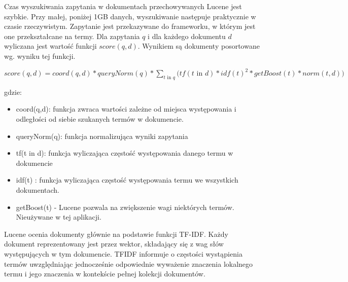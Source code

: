 Czas wyszukiwania zapytania w dokumentach przechowywanych Lucene jest szybkie. Przy małej, poniżej 1GB danych, wyszukiwanie następuje praktycznie w czasie rzeczywistym. Zapytanie jest przekazywane do frameworku, w którym jest one przekształcane na termy. Dla zapytania $q$ i dla każdego dokumentu $d$ wyliczana jest wartość funkcji $score(q,d)$. Wynikiem są dokumenty posortowane wg. wyniku tej funkcji.

$score(q,d) =   coord(q,d)  *  queryNorm(q) * \sum_{t \text{ in } q}  \bigg( tf(t\text{ in } d)  *  idf(t)^2  *  getBoost(t) *  norm(t,d) )$

gdzie:
\begin{itemize}
	\item coord(q,d): funkcja zwraca wartości zależne od miejsca występowania i odległości od siebie szukanych termów w dokumencie.
	\item queryNorm(q): funkcja normalizująca wyniki zapytania
	\item tf(t in d): funkcja wyliczająca częstość występowania danego termu w dokumencie
	\item idf(t) : funkcja wyliczająca częstość występowania termu we wszystkich dokumentach.
	\item getBoost(t) - Lucene pozwala na zwiększenie wagi niektórych termów. Nieużywane w tej aplikacji.
\end{itemize}

Lucene ocenia dokumenty głównie na podstawie funkcji TF-IDF. Każdy dokument reprezentowany jest przez wektor, składający się z wag słów występujących w tym dokumencie. TFIDF informuje o częstości wystąpienia termów uwzględniając jednocześnie odpowiednie wyważenie znaczenia lokalnego termu i jego znaczenia w kontekście pełnej kolekcji dokumentów.

